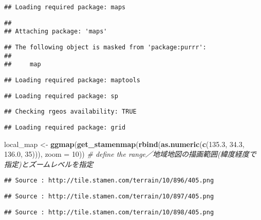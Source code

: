 \documentclass[
  xelatex,ja=standard]{bxjsarticle}
\newenvironment{Shaded}{\begin{snugshade}}{\end{snugshade}}
\newcommand{\CommentTok}[1]{\textcolor[rgb]{0.56,0.35,0.01}{\textit{#1}}}
\newcommand{\DataTypeTok}[1]{\textcolor[rgb]{0.13,0.29,0.53}{#1}}
\newcommand{\DecValTok}[1]{\textcolor[rgb]{0.00,0.00,0.81}{#1}}
\newcommand{\FloatTok}[1]{\textcolor[rgb]{0.00,0.00,0.81}{#1}}
\newcommand{\KeywordTok}[1]{\textcolor[rgb]{0.13,0.29,0.53}{\textbf{#1}}}
\newcommand{\NormalTok}[1]{#1}
\newcommand{\StringTok}[1]{\textcolor[rgb]{0.31,0.60,0.02}{#1}}
\begin{document}
\begin{verbatim}
## Loading required package: maps
\end{verbatim}

\begin{verbatim}
## 
## Attaching package: 'maps'
\end{verbatim}

\begin{verbatim}
## The following object is masked from 'package:purrr':
## 
##     map
\end{verbatim}

\begin{verbatim}
## Loading required package: maptools
\end{verbatim}

\begin{verbatim}
## Loading required package: sp
\end{verbatim}

\begin{verbatim}
## Checking rgeos availability: TRUE
\end{verbatim}

\begin{verbatim}
## Loading required package: grid
\end{verbatim}

\begin{Shaded}
\begin{Highlighting}[]
\NormalTok{local_map <-}\StringTok{ }\KeywordTok{ggmap}\NormalTok{(}\KeywordTok{get_stamenmap}\NormalTok{(}\KeywordTok{rbind}\NormalTok{(}\KeywordTok{as.numeric}\NormalTok{(}\KeywordTok{c}\NormalTok{(}\FloatTok{135.3}\NormalTok{, }\FloatTok{34.3}\NormalTok{,}
                                                    \FloatTok{136.0}\NormalTok{, }\DecValTok{35}\NormalTok{))), }\DataTypeTok{zoom =} \DecValTok{10}\NormalTok{)) }\CommentTok{# define the range／地域地図の描画範囲(緯度経度で指定)とズームレベルを指定}
\end{Highlighting}
\end{Shaded}

\begin{verbatim}
## Source : http://tile.stamen.com/terrain/10/896/405.png
\end{verbatim}

\begin{verbatim}
## Source : http://tile.stamen.com/terrain/10/897/405.png
\end{verbatim}

\begin{verbatim}
## Source : http://tile.stamen.com/terrain/10/898/405.png
\end{verbatim}
\end{document}

